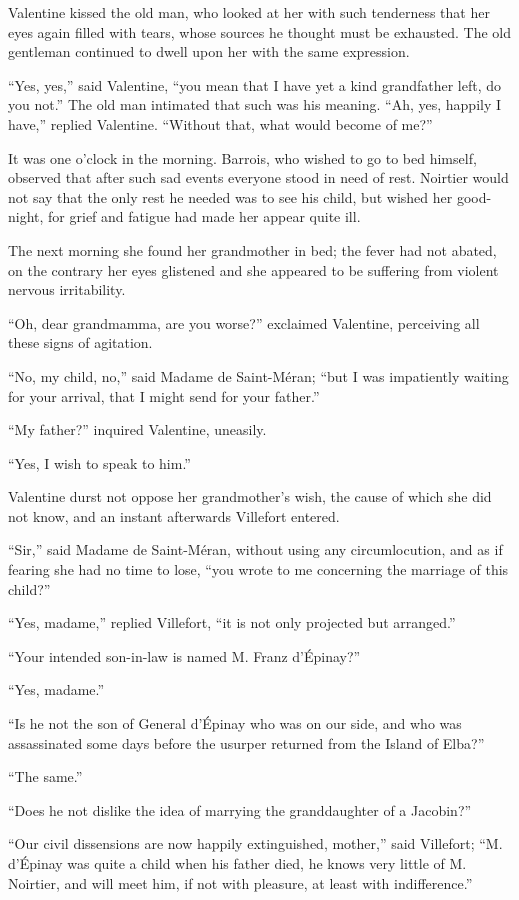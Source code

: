 Valentine kissed the old man, who looked at her with such tenderness
that her eyes again filled with tears, whose sources he thought must be
exhausted. The old gentleman continued to dwell upon her with the same
expression.

“Yes, yes,” said Valentine, “you mean that I have yet a kind
grandfather left, do you not.” The old man intimated that such was his
meaning. “Ah, yes, happily I have,” replied Valentine. “Without that,
what would become of me?”

It was one o’clock in the morning. Barrois, who wished to go to bed
himself, observed that after such sad events everyone stood in need of
rest. Noirtier would not say that the only rest he needed was to see
his child, but wished her good-night, for grief and fatigue had made
her appear quite ill.

The next morning she found her grandmother in bed; the fever had not
abated, on the contrary her eyes glistened and she appeared to be
suffering from violent nervous irritability.

“Oh, dear grandmamma, are you worse?” exclaimed Valentine, perceiving
all these signs of agitation.

“No, my child, no,” said Madame de Saint-Méran; “but I was impatiently
waiting for your arrival, that I might send for your father.”

“My father?” inquired Valentine, uneasily.

“Yes, I wish to speak to him.”

Valentine durst not oppose her grandmother’s wish, the cause of which
she did not know, and an instant afterwards Villefort entered.

“Sir,” said Madame de Saint-Méran, without using any circumlocution,
and as if fearing she had no time to lose, “you wrote to me concerning
the marriage of this child?”

“Yes, madame,” replied Villefort, “it is not only projected but
arranged.”

“Your intended son-in-law is named M. Franz d’Épinay?”

“Yes, madame.”

“Is he not the son of General d’Épinay who was on our side, and who was
assassinated some days before the usurper returned from the Island of
Elba?”

“The same.”

“Does he not dislike the idea of marrying the granddaughter of a
Jacobin?”

“Our civil dissensions are now happily extinguished, mother,” said
Villefort; “M. d’Épinay was quite a child when his father died, he
knows very little of M. Noirtier, and will meet him, if not with
pleasure, at least with indifference.”

